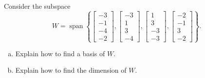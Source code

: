 
\begin{exerciseStatement}


Consider the subspace \[W=\operatorname{span}  \left\{ \left[\begin{array}{c}
-3 \\
-1 \\
-4 \\
-2
\end{array}\right] , \left[\begin{array}{c}
-3 \\
1 \\
3 \\
-4
\end{array}\right] , \left[\begin{array}{c}
1 \\
3 \\
-3 \\
-3
\end{array}\right] , \left[\begin{array}{c}
-2 \\
-1 \\
3 \\
-2
\end{array}\right] \right\} .\]


\begin{enumerate}[(a)]
\item  Explain how to find a basis of \(W\).
\item  Explain how to find the dimension of \(W\).
\end{enumerate}
    
\end{exerciseStatement}
    
